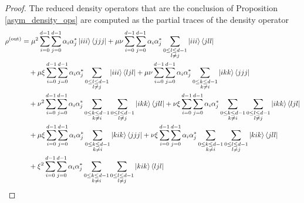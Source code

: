 \documentclass[reqno]{amsart}
\numberwithin{lemma}{section}
\numberwithin{proposition}{section}
\newcommand{\out}{\textnormal{out}}
\begin{document}
{\begin{proof}
The reduced density operators that are the conclusion of Proposition \ref{asym_density_ops} are computed as the partial traces of the density operator
\begin{align*}
\rho^{(\out)} &= \mu^{2} \sum_{i=0}^{d-1} \sum_{j=0}^{d-1}  \alpha_{i} \alpha_{j}^{*} \ket{iii} \bra{jjj} + \mu \nu \sum_{i=0}^{d-1} \sum_{j=0}^{d-1}  \alpha_{i} \alpha_{j}^{*} \sum_{\substack{0 \leq l \leq d-1\\ l \neq j}} \ket{iii} \bra{jll}\\
& \quad + \mu \xi \sum_{i=0}^{d-1} \sum_{j=0}^{d-1}  \alpha_{i} \alpha_{j}^{*} \sum_{\substack{0 \leq l \leq d-1\\ l \neq j}} \ket{iii} \bra{ljl}
 + \mu \nu \sum_{i=0}^{d-1} \sum_{j=0}^{d-1}  \alpha_{i} \alpha_{j}^{*} \sum_{\substack{0 \leq k \leq d-1\\ k \neq i}} \ket{ikk} \bra{jjj} \\
& \quad  + \nu^{2} \sum_{i=0}^{d-1} \sum_{j=0}^{d-1}  \alpha_{i} \alpha_{j}^{*} \sum_{\substack{0 \leq k \leq d-1\\ k \neq i}} \sum_{\substack{0 \leq l \leq d-1\\ l \neq j}} \ket{ikk} \bra{jll}
+ \nu \xi \sum_{i=0}^{d-1} \sum_{j=0}^{d-1}  \alpha_{i} \alpha_{j}^{*} \sum_{\substack{0 \leq k \leq d-1\\ k \neq i}} \sum_{\substack{0 \leq l \leq d-1\\ l \neq j}} \ket{ikk} \bra{ljl}\\
& \quad + \mu \xi \sum_{i=0}^{d-1} \sum_{j=0}^{d-1}  \alpha_{i} \alpha_{j}^{*} \sum_{\substack{0 \leq k \leq d-1\\ k \neq i}} \ket{kik} \bra{jjj} 
+ \nu \xi \sum_{i=0}^{d-1} \sum_{j=0}^{d-1}  \alpha_{i} \alpha_{j}^{*} \sum_{\substack{0 \leq k \leq d-1\\ k \neq i}} \sum_{\substack{0 \leq l \leq d-1\\ l \neq j}} \ket{kik} \bra{jll}\\
& \quad + \xi^{2} \sum_{i=0}^{d-1} \sum_{j=0}^{d-1} \alpha_{i} \alpha_{j}^{*} \sum_{\substack{0 \leq k \leq d-1\\ k \neq i}} \sum_{\substack{0 \leq l \leq d-1\\ l \neq j}} \ket{kik} \bra{ljl} 
\end{align*}


\end{proof}}
\end{document}
